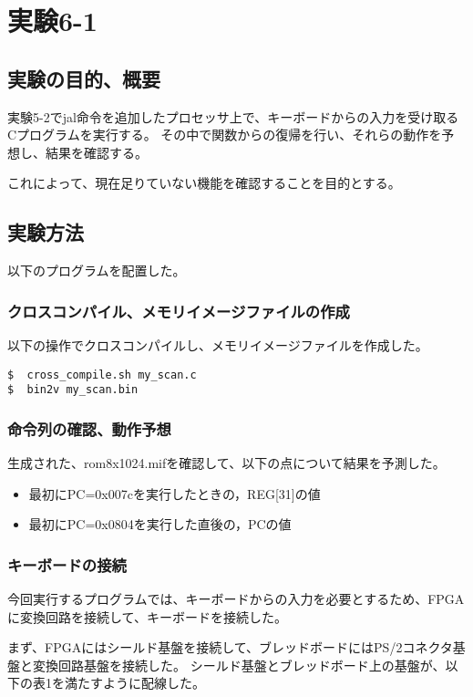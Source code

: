 \section{実験6-1}
\subsection{実験の目的、概要}
実験5-2でjal命令を追加したプロセッサ上で、キーボードからの入力を受け取るCプログラムを実行する。
その中で関数からの復帰を行い、それらの動作を予想し、結果を確認する。

これによって、現在足りていない機能を確認することを目的とする。

\subsection{実験方法}
以下のプログラムを配置した。


\subsubsection{クロスコンパイル、メモリイメージファイルの作成}
以下の操作でクロスコンパイルし、メモリイメージファイルを作成した。
\begin{lstlisting}[caption={クロスコンパイル、メモリイメージファイルの作成},label={クロスコンパイル、メモリイメージファイルの作成5-1}]
$  cross_compile.sh my_scan.c
$  bin2v my_scan.bin
\end{lstlisting}

\subsubsection{命令列の確認、動作予想}
生成された、rom8x1024.mifを確認して、以下の点について結果を予測した。
\begin{itemize}
  \item 最初にPC=0x007cを実行したときの，REG[31]の値
  \item 最初にPC=0x0804を実行した直後の，PCの値
\end{itemize}

\subsubsection{キーボードの接続}
今回実行するプログラムでは、キーボードからの入力を必要とするため、FPGAに変換回路を接続して、キーボードを接続した。

まず、FPGAにはシールド基盤を接続して、ブレッドボードにはPS/2コネクタ基盤と変換回路基盤を接続した。
シールド基盤とブレッドボード上の基盤が、以下の表1を満たすように配線した。

